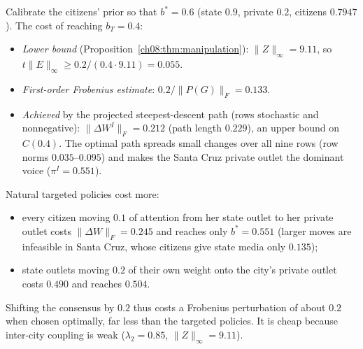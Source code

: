 \documentclass[../solutions_manual.tex]{subfiles}
\begin{document}
 Calibrate the citizens' prior so that $b^* = 0.6$ (state $0.9$, private $0.2$, citizens $0.7947$). The cost of reaching $b_T = 0.4$:
\begin{itemize}
\item \emph{Lower bound} (Proposition~\ref{ch08:thm:manipulation}): $\|Z\|_\infty = 9.11$, so $t\|E\|_\infty \ge 0.2/(0.4\cdot 9.11) = 0.055$.
\item \emph{First-order Frobenius estimate}: $0.2/\|P(G)\|_F = 0.133$.
\item \emph{Achieved} by the projected steepest-descent path (rows stochastic and nonnegative): $\|\Delta W^I\|_F = 0.212$ (path length $0.229$), an upper bound on $C(0.4)$. The optimal path spreads small changes over all nine rows (row norms $0.035$--$0.095$) and makes the Santa Cruz private outlet the dominant voice ($\pi^I = 0.551$).
\end{itemize}
Natural targeted policies cost more:
\begin{itemize}
\item every citizen moving $0.1$ of attention from her state outlet to her private outlet costs $\|\Delta W\|_F = 0.245$ and reaches only $b^* = 0.551$ (larger moves are infeasible in Santa Cruz, whose citizens give state media only $0.135$);
\item state outlets moving $0.2$ of their own weight onto the city's private outlet costs $0.490$ and reaches $0.504$.
\end{itemize}
Shifting the consensus by $0.2$ thus costs a Frobenius perturbation of about $0.2$ when chosen optimally, far less than the targeted policies. It is cheap because inter-city coupling is weak ($\lambda_2 = 0.85$, $\|Z\|_\infty = 9.11$).
\end{document}
